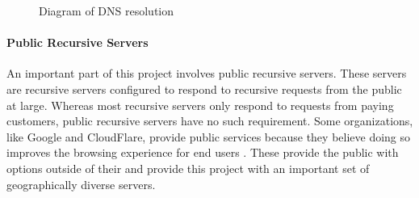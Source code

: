 \begin{figure}[h]
    \centering
    \caption{Diagram of DNS resolution}
    \label{fig:dns_resolution}
\end{figure}

\paragraph{Public Recursive \dns Servers}
An important part of this project involves public recursive \dns servers. These servers are recursive \dns servers configured to respond to recursive requests from the public at large. Whereas most \isp recursive servers only respond to requests from paying customers, public recursive servers have no such requirement. Some organizations, like Google and CloudFlare, provide public \dns services because they believe doing so improves the browsing experience for end users \cite{GoogleIntroductionDNS}. These provide the public with \dns options outside of their \isp and provide this project with an important set of geographically diverse servers.
